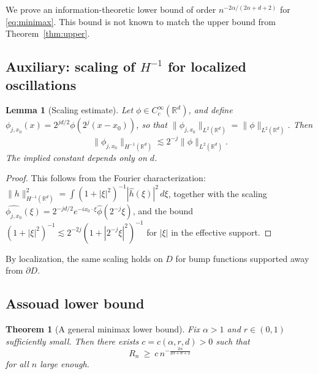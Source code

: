 \documentclass[11pt]{article}
\newtheorem{theorem}{Theorem}
\newtheorem{lemma}{Lemma}
\newcommand{\R}{\mathbb{R}}
\newcommand{\D}{D}
\begin{document}
We prove an information-theoretic lower bound of order $n^{-2\alpha/(2\alpha+d+2)}$ for \eqref{eq:minimax}. This bound is not known to match the upper bound from Theorem~\ref{thm:upper}.

\subsection{Auxiliary: scaling of $H^{-1}$ for localized oscillations}

\begin{lemma}[Scaling estimate]\label{lem:Hminus1scaling}
Let $\phi\in C^\infty_c(\R^d)$, and define $\phi_{j,x_0}(x)=2^{jd/2}\phi(2^j(x-x_0))$, so that $\|\phi_{j,x_0}\|_{L^2(\R^d)}=\|\phi\|_{L^2(\R^d)}$. Then
\[
\|\phi_{j,x_0}\|_{H^{-1}(\R^d)} \lesssim 2^{-j}\|\phi\|_{L^2(\R^d)}.
\]
The implied constant depends only on $d$.
\end{lemma}

\begin{proof}
This follows from the Fourier characterization:
$\|h\|_{H^{-1}(\R^d)}^2=\int (1+|\xi|^2)^{-1}|\hat h(\xi)|^2\,d\xi$,
together with the scaling $\widehat{\phi_{j,x_0}}(\xi)=2^{-jd/2}e^{-i x_0\cdot \xi}\hat\phi(2^{-j}\xi)$, and the bound $(1+|\xi|^2)^{-1}\lesssim 2^{-2j}(1+|2^{-j}\xi|^2)^{-1}$ for $|\xi|$ in the effective support.
\end{proof}

By localization, the same scaling holds on $\D$ for bump functions supported away from $\partial\D$.

\subsection{Assouad lower bound}

\begin{theorem}[A general minimax lower bound]\label{thm:lower}
Fix $\alpha>1$ and $r\in(0,1)$ sufficiently small. Then there exists $c=c(\alpha,r,d)>0$ such that
\[
R_n \ \ge\ c\, n^{-\frac{2\alpha}{2\alpha+d+2}}
\]
for all $n$ large enough.
\end{theorem}
\end{document}
